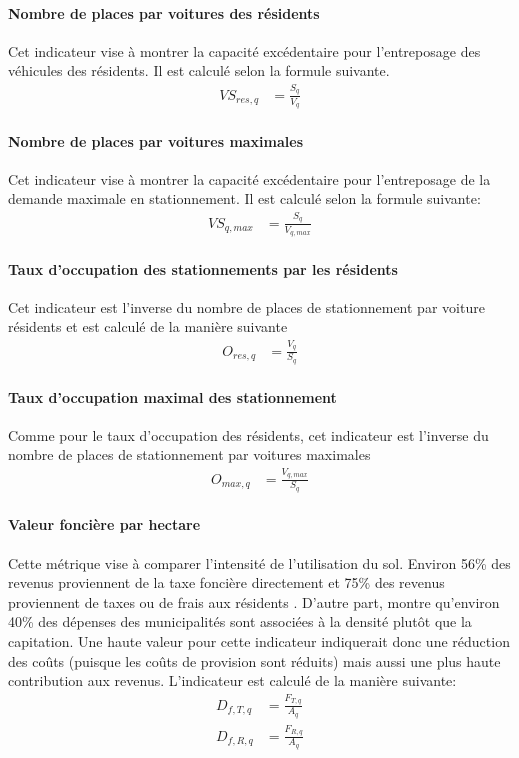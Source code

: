             \paragraph{Nombre de places par voitures des résidents} Cet indicateur vise à montrer la capacité excédentaire pour l'entreposage des véhicules des résidents. Il est calculé selon la formule suivante. 
            \begin{align}
                VS_{res,q} &= \frac{S_q}{V_q}
            \end{align}
            \paragraph{Nombre de places par voitures maximales} Cet indicateur vise à montrer la capacité excédentaire pour l'entreposage de la demande maximale en stationnement. Il est calculé selon la formule suivante:
            \begin{align}
                VS_{q,max} &=\frac{S_q}{V_{q,max}}
            \end{align}
            \paragraph{Taux d'occupation des stationnements par les résidents} Cet indicateur est l'inverse du nombre de places de stationnement par voiture résidents et est calculé de la manière suivante
            \begin{align}
                O_{res,q} &= \frac{V_q}{S_q}
            \end{align}
            \paragraph{Taux d'occupation maximal des stationnement} Comme pour le taux d'occupation des résidents, cet indicateur est l'inverse du nombre de places de stationnement par voitures maximales
            \begin{align}
                O_{max,q} &= \frac{V_{q,max}}{S_q}
            \end{align}
            \paragraph{Valeur foncière par hectare} Cette métrique vise à comparer l'intensité de l'utilisation du sol. Environ 56\% des revenus proviennent de la taxe foncière directement et 75\% des revenus proviennent de taxes ou de frais aux résidents \parencite{ville_de_quebec_budget_2025}. D'autre part, \textcite{metro_vancouver_regional_planning_cost_2023} montre qu'environ 40\% des dépenses des municipalités sont associées à la densité plutôt que la capitation. Une haute valeur pour cette indicateur indiquerait donc une réduction des coûts (puisque les coûts de provision sont réduits) mais aussi une plus haute contribution aux revenus. L'indicateur est calculé de la manière suivante:
            \begin{align}
                D_{f,T,q} &= \frac{F_{T,q}}{A_q}\\
                D_{f,R,q} &= \frac{F_{R,q}}{A_q}
            \end{align}